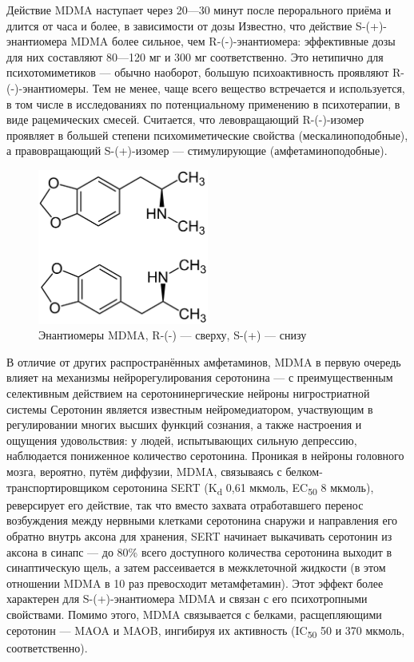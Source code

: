 \documentclass[a4paper,14pt,russian]{report}
\begin{document}
Действие MDMA наступает через 20—30 минут после перорального приёма и длится от часа и более, в зависимости от дозы Известно, что действие S-(+)-энантиомера MDMA более сильное, чем R-(-)-энантиомера: эффективные дозы для них составляют 80—120 мг и 300 мг соответственно. Это нетипично для психотомиметиков — обычно наоборот, большую психоактивность проявляют R-(-)-энантиомеры. Тем не менее, чаще всего вещество встречается и используется, в том числе в исследованиях по потенциальному применению в психотерапии, в виде рацемических смесей. Считается, что левовращающий R-(-)-изомер проявляет в большей степени психомиметические свойства (мескалиноподобные), а правовращающий S-(+)-изомер — стимулирующие (амфетаминоподобные).

\begin{figure}[!htb]
\centerline{\includegraphics[width=0.5\textwidth]{formula}}
\caption{Энантиомеры MDMA, R-(-) — сверху, S-(+) — снизу}
\end{figure}

В отличие от других распространённых амфетаминов, MDMA в первую очередь влияет на механизмы нейрорегулирования серотонина — с преимущественным селективным действием на серотонинергические нейроны нигростриатной системы Серотонин является известным нейромедиатором, участвующим в регулировании многих высших функций сознания, а также настроения и ощущения удовольствия: у людей, испытывающих сильную депрессию, наблюдается пониженное количество серотонина. Проникая в нейроны головного мозга, вероятно, путём диффузии, MDMA, связываясь с белком-транспортировщиком серотонина SERT (K\textsubscript{d} 0,61 мкмоль, EC\textsubscript{50} 8 мкмоль), реверсирует его действие, так что вместо захвата отработавшего перенос возбуждения между нервными клетками серотонина снаружи и направления его обратно внутрь аксона для хранения, SERT начинает выкачивать серотонин из аксона в синапс — до 80\% всего доступного количества серотонина выходит в синаптическую щель, а затем рассеивается в межклеточной жидкости (в этом отношении MDMA в 10 раз превосходит метамфетамин). Этот эффект более характерен для S-(+)-энантиомера MDMA и связан с его психотропными свойствами. Помимо этого, MDMA связывается с белками, расщепляющими серотонин — MAOA и MAOB, ингибируя их активность (IC\textsubscript{50} 50 и 370 мкмоль, соответственно).
\end{document}
